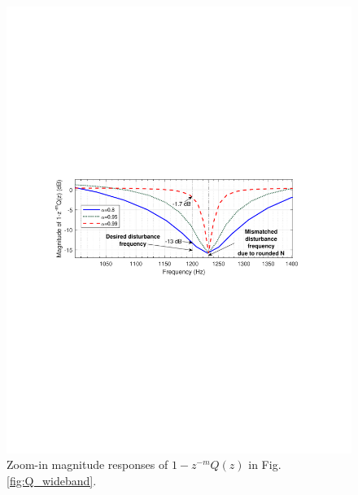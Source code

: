 \documentclass [11pt, proquest] {uwthesis}[2020/02/24]
\begin{document}
\begin{figure}[!ht]
\begin{centering}
\includegraphics[width=14cm]{Fractional-order-RC/Q_wideband_zoomin}
\par\end{centering}
\caption{\label{fig:Zoom-in-magnitude-responses}Zoom-in magnitude responses
of $1-z^{-m}Q\left(z\right)$ in Fig. \ref{fig:Q_wideband}.}
\end{figure}
\end{document}
